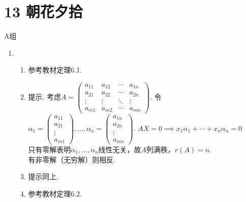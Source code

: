 \section*{13 朝花夕拾}

\vspace{2ex}

\centerline{\heiti A组}
\begin{enumerate}
    \item \begin{enumerate}
              \item 参考教材定理6.1.

              \item 提示. 考虑$A=\begin{pmatrix}
                            a_{11} & a_{12} & \cdots & a_{1n} \\
                            a_{21} & a_{22} & \cdots & a_{2n} \\
                            \vdots & \vdots & \ddots & \vdots \\
                            a_{m1} & a_{m2} & \cdots & a_{mn}
                        \end{pmatrix}$. 令$\alpha_1=\begin{pmatrix}
                            a_{11} \\
                            a_{21} \\
                            \vdots \\
                            a_{m1}
                        \end{pmatrix},\ldots,\alpha_n=\begin{pmatrix}
                            a_{1n} \\
                            a_{2n} \\
                            \vdots \\
                            a_{mn}
                        \end{pmatrix}$. $AX=0\implies x_1\alpha_1+\cdots+x_n\alpha_n=0$\\
                    只有零解表明$\alpha_1,\ldots,\alpha_n$线性无关，故$A$列满秩，$r(A)=n$.\\
                    有非零解（无穷解）则相反.

              \item 提示同上.

              \item 参考教材定理6.2.


\end{enumerate}
\end{enumerate}
